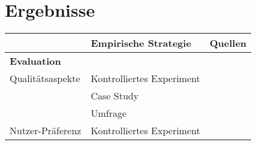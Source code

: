 \pagebreak

\section{Ergebnisse}


\begin{table}
    \begin{center}
        \begin{tabular}{|p{}p{}p{}|}
            \hline
             & \textbf{Empirische Strategie} & \textbf{Quellen} \\ \hline
             \textbf{Evaluation} & & \\
            Qualitätsaspekte                                                                &
            Kontrolliertes Experiment                                                       &
                 \cite{tintarev_designing_nodate} \cite{sato_context_nodate} \cite{eiband_impact_2019} \cite{tsai_evaluating_2019} \cite{hernandez-bocanegra_effects_2020} \cite{balog_measuring_2020} \cite{kunkel_let_2019} \cite{schaffer_i_2019} \cite{weitz_you_2019} \cite{yamada_evaluating_2016} \cite{sato_action-triggering_2019} \cite{haspiel_explanations_2018} \cite{zahedi_towards_2019} \cite{zolotas_towards_2019} \cite{riveiro_thats_2021}  \cite{martin_evaluating_2021} \cite{tsai_effects_2020}    \cite{neerincx_using_2018} \cite{schrills_color_2020} \cite{wang_is_2018} \cite{zhu_effects_2020} \cite{koo_why_2015} \cite{koo_understanding_2016} \cite{cheng2019explaining}
                 \\
                                                                                            &
            Case Study                                                                      &
                 \cite{martin_developing_2019} \cite{ehsan_human-centered_2020}
                 \\
                                                                                            &
            Umfrage                                                                         &
                \cite{chazette_end-users_nodate} \cite{chazette2020explainability} \cite{sokol_one_2020}
            \\
            Nutzer-Präferenz                                                                &
            Kontrolliertes Experiment                                                       &

\end{tabular}
\end{center}
\end{table}
